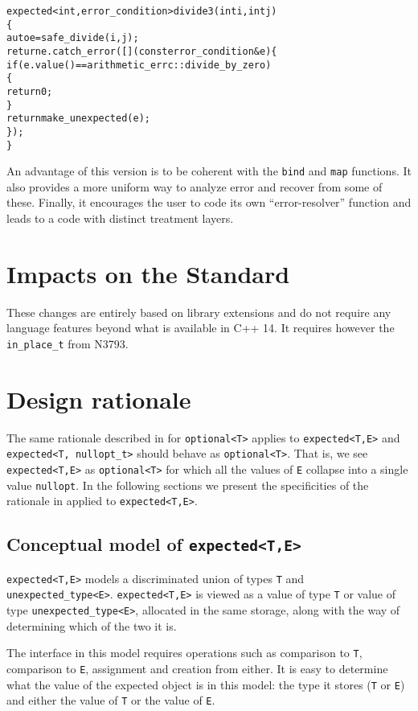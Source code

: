 \documentclass[a4paper,10pt]{article}
\newcommand{\cpp}[1]{\lstinline{#1}}
\begin{document}
\begin{alltt}
expected<int, error_condition> divide3(int i, int j)
\{
  auto e = safe_divide(i,j);
  return e.catch_error([](const error_condition& e)\{
    if(e.value() == arithmetic_errc::divide_by_zero)
    \{
      return 0;
    \}
    return make_unexpected(e);
  \});
\}
\end{alltt}

An advantage of this version is to be coherent with the \cpp{bind} and \cpp{map} functions. It also provides a more uniform way to analyze error and recover from some of these. Finally, it encourages the user to code its own ``error-resolver'' function and leads to a code with distinct treatment layers.

\section{Impacts on the Standard}

These changes are entirely based on library extensions and do not require any language features beyond what is available in C++ 14. It requires however the \cpp{in_place_t} from N3793.

\section{Design rationale}

The same rationale described in \cite{OptionalRev4} for \cpp{optional<T>} applies to \cpp{expected<T,E>} and \cpp{expected<T, nullopt_t>} should behave as \cpp{optional<T>}.  That is, we see \cpp{expected<T,E>} as \cpp{optional<T>} for which all the values of \cpp{E} collapse into a single value \cpp{nullopt}. In the following sections we present the specificities of the rationale in \cite{OptionalRev4} applied to  \cpp{expected<T,E>}.

\subsection{Conceptual model of \cpp{expected<T,E>}}

\cpp{expected<T,E>} models a discriminated union of types \cpp{T} and \cpp{unexpected_type<E>}. \cpp{expected<T,E>} is viewed as a value of type \cpp{T} or value of type \cpp{unexpected_type<E>}, allocated in the same storage, along with the way of determining which of the two it is. 

The interface in this model requires operations such as comparison to \cpp{T}, comparison to \cpp{E}, assignment and creation from either. It is easy to determine what the value of the expected object is in this model: the type it stores (\cpp{T} or \cpp{E}) and either the value of \cpp{T} or the value of \cpp{E}. 
\end{document}
